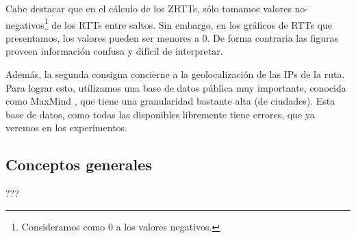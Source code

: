 \par Cabe destacar que en el cálculo de los ZRTTs, sólo tomamos valores no-negativos\footnote{Consideramos como 0 a los valores negativos.} de los RTTs entre saltos. 
Sin embargo, en los gráficos de RTTs que presentamos, los valores pueden ser menores a 0.
De forma contraria las figuras proveen información confusa y difícil de interpretar.

Además, la segunda consigna concierne a la geolocalización de las IPs de la ruta. Para lograr esto, utilizamos una base de datos pública muy importante, conocida como MaxMind \cite{MaxMind}, que tiene una granularidad bastante alta (de ciudades). Esta base de datos, como todas las disponibles libremente tiene errores, que ya veremos en los experimentos.



\subsection{Conceptos generales}
???
